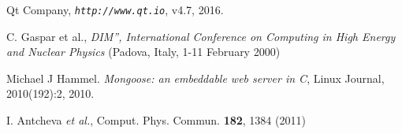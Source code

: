\documentclass[conference]{IEEEtran}
\begin{document}
\begin{thebibliography}{1}

  
Qt Company, \emph{\tt http://www.qt.io}, v4.7, 2016.

C. Gaspar et al., \emph{DIM”, International Conference on Computing in High Energy and Nuclear Physics} (Padova,  Italy,
1-11 February 2000)

Michael J Hammel. \emph{Mongoose: an embeddable web server in C}, Linux Journal, 2010(192):2, 2010.

I. Antcheva \textit{et al.}, Comput. Phys. Commun. \textbf{182}, 1384 (2011)

\end{thebibliography}
\end{document}
